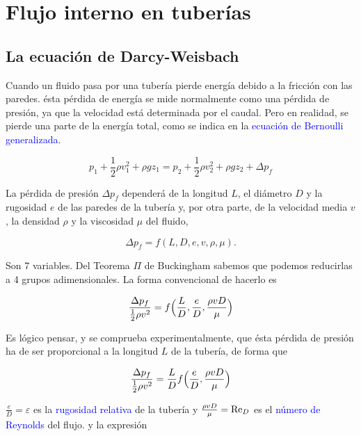\chapter[Flujo en tuberías]{Flujo interno en tuberías}
\section{La ecuación de Darcy-Weisbach}
Cuando un fluido pasa por una tubería pierde energía debido a la fricción con las paredes. ésta pérdida de energía se mide normalmente como una pérdida de presión, ya que la velocidad está determinada por el caudal. Pero en realidad, se pierde una parte de la energía total, como se indica en la \textcolor{blue}{ecuación de Bernoulli generalizada}.

\begin{equation}
	p_1 + \frac{1}{2}\rho v_1^2 + \rho g z_1 = p_2 + \frac{1}{2}\rho v_2^2 + \rho g z_2 + \Delta p_f
\end{equation}


La pérdida de presión $\Delta p_f$ dependerá de la longitud $L$, el diámetro $D$ y la rugosidad $e$ de las paredes de la tubería y, por otra parte, de la velocidad media $v$, la densidad $\rho$ y la viscosidad $\mu$ del fluido,

\begin{equation}
	\Delta p_f = f(L,D,e,v,\rho,\mu).
\end{equation}

Son 7 variables. Del Teorema $\Pi$ de Buckingham sabemos que podemos reducirlas a 4 grupos adimensionales. La forma convencional de hacerlo es

\begin{equation}
	\frac{\Delta p_f}{\frac{1}{2} \rho v^2} = f\Bigl(\frac{L}{D},\frac{e}{D},\frac{\rho v D}{\mu}\Bigr)
\end{equation}


Es lógico pensar, y se comprueba experimentalmente, que ésta pérdida de presión ha de ser proporcional a la longitud $L$ de la tubería, de forma que

\begin{equation}
	\frac{\Delta p_f}{\frac{1}{2} \rho v^2} = \frac{L}{D} f\Bigl(\frac{e}{D},\frac{\rho v D}{\mu}\Bigr)
\end{equation}


$\frac{e}{D} = \varepsilon$ es la \textcolor{blue}{rugosidad relativa} de la tubería y $\frac{\rho v D}{\mu} = \text{Re}_D $ es el \textcolor{blue}{número de Reynolds} del flujo. y la expresión

